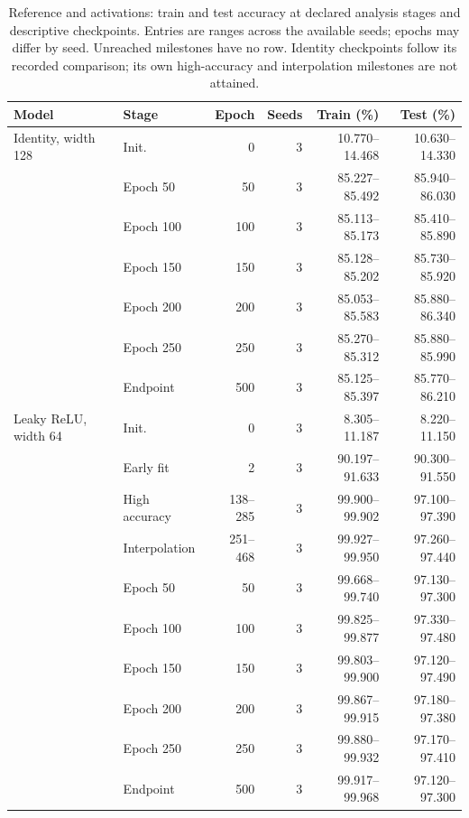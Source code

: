 \FloatBarrier
\begin{table}[!htbp]\centering
\caption{Reference and activations: train and test accuracy at declared analysis stages and descriptive checkpoints. Entries are ranges across the available seeds; epochs may differ by seed. Unreached milestones have no row. Identity checkpoints follow its recorded comparison; its own high-accuracy and interpolation milestones are not attained.}\label{tab:perf-0-3}
\small\setlength{\tabcolsep}{4pt}
\begin{tabular}{llrrrr}\toprule
Model & Stage & Epoch & Seeds & Train (\%) & Test (\%)\\\midrule
Identity, width 128 & Init. & 0 & 3 & 10.770--14.468 & 10.630--14.330\\
 & Epoch 50 & 50 & 3 & 85.227--85.492 & 85.940--86.030\\
 & Epoch 100 & 100 & 3 & 85.113--85.173 & 85.410--85.890\\
 & Epoch 150 & 150 & 3 & 85.128--85.202 & 85.730--85.920\\
 & Epoch 200 & 200 & 3 & 85.053--85.583 & 85.880--86.340\\
 & Epoch 250 & 250 & 3 & 85.270--85.312 & 85.880--85.990\\
 & Endpoint & 500 & 3 & 85.125--85.397 & 85.770--86.210\\
\midrule
Leaky ReLU, width 64 & Init. & 0 & 3 & 8.305--11.187 & 8.220--11.150\\
 & Early fit & 2 & 3 & 90.197--91.633 & 90.300--91.550\\
 & High accuracy & 138--285 & 3 & 99.900--99.902 & 97.100--97.390\\
 & Interpolation & 251--468 & 3 & 99.927--99.950 & 97.260--97.440\\
 & Epoch 50 & 50 & 3 & 99.668--99.740 & 97.130--97.300\\
 & Epoch 100 & 100 & 3 & 99.825--99.877 & 97.330--97.480\\
 & Epoch 150 & 150 & 3 & 99.803--99.900 & 97.120--97.490\\
 & Epoch 200 & 200 & 3 & 99.867--99.915 & 97.180--97.380\\
 & Epoch 250 & 250 & 3 & 99.880--99.932 & 97.170--97.410\\
 & Endpoint & 500 & 3 & 99.917--99.968 & 97.120--97.300\\
\bottomrule\end{tabular}\end{table}

